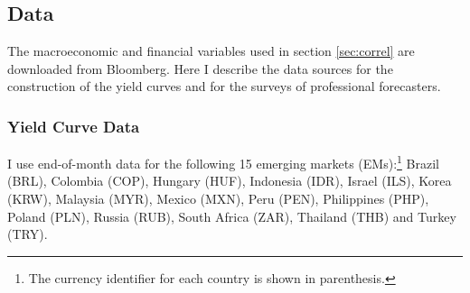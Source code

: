{%
%

\subsection{Data}
The macroeconomic and financial variables used in section \ref{sec:correl} are downloaded from Bloomberg. Here I describe the data sources for the construction of the yield curves and for the surveys of professional forecasters.

\subsubsection{Yield Curve Data}
I use end-of-month data for the following 15 emerging markets (EMs):\footnote{The currency identifier for each country is shown in parenthesis.} Brazil (BRL), Colombia (COP), Hungary (HUF), Indonesia (IDR), Israel (ILS), Korea (KRW), Malaysia (MYR), Mexico (MXN), Peru (PEN), Philippines (PHP), Poland (PLN), Russia (RUB), South Africa (ZAR), Thailand (THB) and Turkey (TRY). 

}
